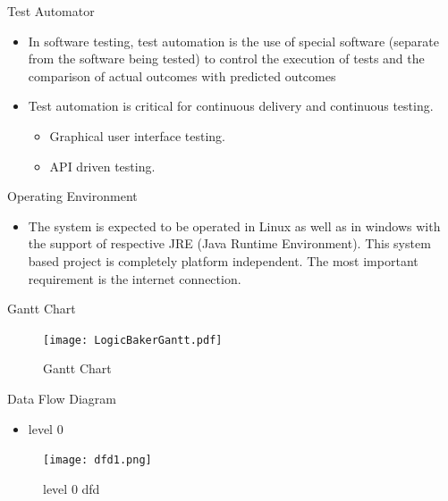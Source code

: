 \documentclass{beamer}
\begin{document}
\begin{frame}{Test Automator}
\begin{itemize}
\item  In software testing, test automation is the use of special software (separate from the
software being tested) to control the execution of tests and the comparison of actual outcomes with predicted outcomes
\vspace{0.5 cm}
\item Test automation is critical for continuous
delivery and continuous testing.
\vspace{0.5 cm}
\begin{itemize}
\item  Graphical user interface testing.
\item API driven testing.
\end{itemize}
\end{itemize}
\end{frame}

\begin{frame}{Operating Environment}
\begin{itemize}
\item The system is expected to be operated in Linux as well as in windows with the support of
respective JRE (Java Runtime Environment). This system based project is completely platform
independent. The most important requirement is the internet connection.
\end{itemize}
\end{frame}

\begin{frame}{Gantt Chart}
\begin{figure}[h]
\begin{center}
\texttt{[image: LogicBakerGantt.pdf]}
\caption{Gantt Chart}
\end{center}
\end{figure}
\end{frame}

\begin{frame}{Data Flow Diagram}
\begin{itemize}
\item level 0
\end{itemize}
\begin{figure}[h]
\begin{center}
\texttt{[image: dfd1.png]}
\caption{level 0 dfd}
\end{center}
\end{figure}
\end{frame}
\end{document}

